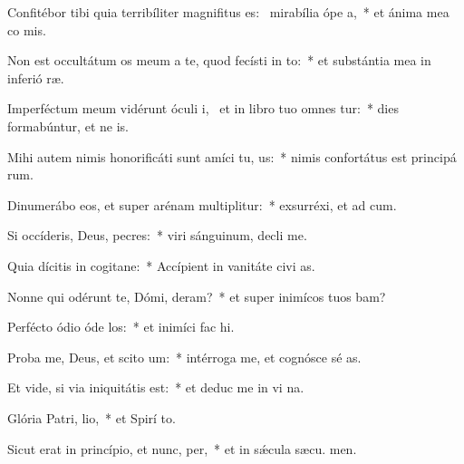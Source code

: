 \item Confitébor tibi quia terribíliter magnifitus es:~\pscross{} mirabília ópe a,~* et ánima mea co mis.
\item Non est occultátum os meum a te, quod fecísti in to:~* et substántia mea in inferió ræ.
\item Imperféctum meum vidérunt óculi i,~\pscross{} et in libro tuo omnes tur:~* dies formabúntur, et ne  is.
\item Mihi autem nimis honorificáti sunt amíci tu, us:~* nimis confortátus est principá rum.
\item Dinumerábo eos, et super arénam multiplitur:~* exsurréxi, et ad  cum.
\item Si occíderis, Deus, pecres:~* viri sánguinum, decli  me.
\item Quia dícitis in cogitane:~* Accípient in vanitáte civi as.
\item Nonne qui odérunt te, Dómi, deram?~* et super inimícos tuos bam?
\item Perfécto ódio óde los:~* et inimíci fac  hi.
\item Proba me, Deus, et scito  um:~* intérroga me, et cognósce sé as.
\item Et vide, si via iniquitátis   est:~* et deduc me in vi na.
\item Glória Patri,  lio,~* et Spirí to.
\item Sicut erat in princípio, et nunc,  per,~* et in sǽcula sæcu. men.
